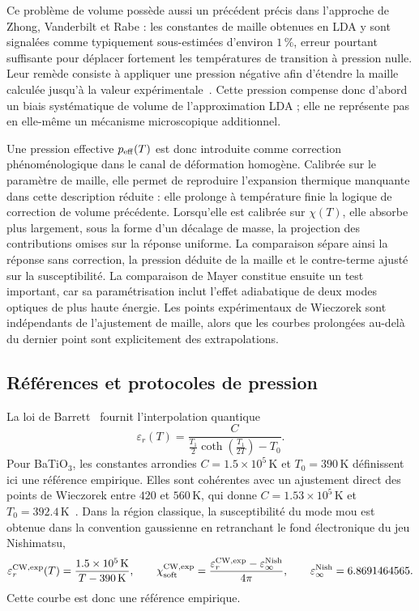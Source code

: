 Ce problème de volume possède aussi un précédent précis dans l'approche de
Zhong, Vanderbilt et Rabe : les constantes de maille obtenues en LDA y sont
signalées comme typiquement sous-estimées d'environ $1\,\%$, erreur pourtant
suffisante pour déplacer fortement les températures de transition à pression
nulle. Leur remède consiste à appliquer une pression négative afin d'étendre la
maille calculée jusqu'à la valeur expérimentale~\cite{Zhong1995}. Cette pression
compense donc d'abord un biais systématique de volume de l'approximation LDA ;
elle ne représente pas en elle-même un mécanisme microscopique additionnel.

Une pression effective $p_{\rm eff}(T)$ est donc introduite comme correction
phénoménologique dans le canal de déformation homogène. Calibrée sur le
paramètre de maille, elle permet de reproduire l'expansion thermique manquante
dans cette description réduite : elle prolonge à température finie la logique
de correction de volume précédente. Lorsqu'elle est calibrée sur $\chi(T)$, elle
absorbe plus largement, sous la forme d'un décalage de masse, la projection des
contributions omises sur la réponse uniforme. La comparaison sépare ainsi la réponse sans
correction, la pression déduite de la maille et le contre-terme ajusté sur la
susceptibilité. La
comparaison de Mayer constitue ensuite un test important, car sa paramétrisation
inclut l'effet adiabatique de deux modes optiques de plus haute énergie. Les
points expérimentaux de Wieczorek sont indépendants de l'ajustement de maille,
alors que les courbes prolongées au-delà du dernier point sont explicitement
des extrapolations.

\subsection{Références et protocoles de pression}

La loi de Barrett~\cite{Barrett1952} fournit l'interpolation quantique
\begin{equation}
\varepsilon_r(T)=
\frac{C}{\frac{T_1}{2}\coth\!\left(\frac{T_1}{2T}\right)-T_0}.
\label{eq:core_barrett_law}
\end{equation}
Pour BaTiO$_3$, les constantes arrondies $C=1.5\times10^5\,\mathrm K$ et
$T_0=390\,\mathrm K$ définissent ici une référence empirique. Elles sont
cohérentes avec un ajustement direct des points de Wieczorek entre
$420$ et $560\,\mathrm K$, qui donne $C=1.53\times10^5\,\mathrm K$ et
$T_0=392.4\,\mathrm K$~\cite{Wieczorek2006}. Dans la région classique, la
susceptibilité du mode mou est obtenue dans la convention gaussienne en
retranchant le fond électronique du jeu Nishimatsu,
\begin{equation}
\varepsilon_r^{\rm CW,exp}(T)
=\frac{1.5\times10^5\,\mathrm K}{T-390\,\mathrm K},
\qquad
\chi_{\rm soft}^{\rm CW,exp}
=\frac{\varepsilon_r^{\rm CW,exp}-\varepsilon_\infty^{\rm Nish}}{4\pi},
\qquad
\varepsilon_\infty^{\rm Nish}=6.8691464565.
\label{eq:core_barrett_reference}
\end{equation}
Cette courbe est donc une référence empirique.

